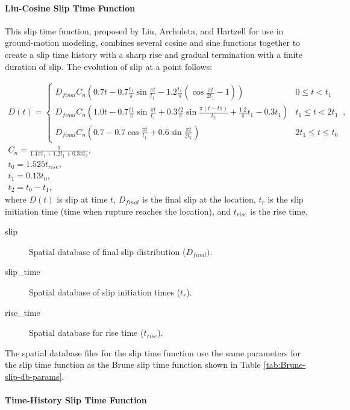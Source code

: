\paragraph{Liu-Cosine Slip Time Function}

This slip time function, proposed by Liu, Archuleta, and Hartzell
for use in ground-motion modeling\cite{Liu:etal:2006}, combines several
cosine and sine functions together to create a slip time history with
a sharp rise and gradual termination with a finite duration of slip.
The evolution of slip at a point follows: 

\begin{gather}
D(t)=\left\{ \begin{array}{cc}
D_{\mathit{final}}C_{n}\left(0.7t-0.7\frac{t_{1}}{\pi}\sin\frac{\pi t}{t_{1}}-1.2\frac{t_{1}}{\pi}\left(\cos\frac{\pi t}{2t_{1}}-1\right)\right) & 0\leq t<t_{1}\\
D_{\mathit{final}}C_{n}\left(1.0t-0.7\frac{t1}{\pi}\sin\frac{\pi t}{t_{1}}+0.3\frac{t2}{\pi}\sin\frac{\pi(t-t1)}{t_{2}}+\frac{1.2}{\pi}t_{1}-0.3t_{1}\right) & t_{1}\leq t<2t_{1}\\
D_{\mathit{final}}C_{n}\left(0.7-0.7\cos\frac{\pi t}{t_{1}}+0.6\sin\frac{\pi t}{2t_{1}}\right) & 2t_{1}\leq t\leq t_{0}
\end{array}\right.\,,\\
C_{n}=\frac{\pi}{1.4\pi t_{1}+1.2t_{1}+0.3\pi t_{2}},\\
t_{0}=1.525t_{\mathit{rise}},\\
t_{1}=0.13t_{0},\\
t_{2}=t_{0}-t_{1},
\end{gather}
where $D(t)$ is slip at time $t$, $D_{final}$ is the final slip
at the location, $t_{r}$ is the slip initiation time (time when rupture
reaches the location), and $t_{\mathit{rise}}$ is the rise time.
\begin{description}
\item [{slip}] Spatial database of final slip distribution ($D_{final})$.
\item [{slip\_time}] Spatial database of slip initiation times ($t_{r}$).
\item [{rise\_time}] Spatial database for rise time ($t_{\mathit{rise}}$).
\end{description}
The spatial database files for the slip time function use the same
parameters for the slip time function as the Brune slip time function
shown in Table \vref{tab:Brune-slip-db-params}.


\paragraph{Time-History Slip Time Function}

